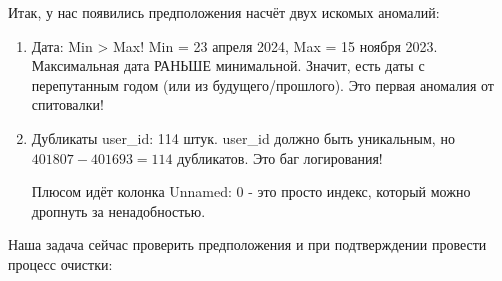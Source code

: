 \documentclass[pract]{SCWorks}
\begin{document}
Итак, у нас появились предположения насчёт двух искомых аномалий:

\begin{enumerate}
    \item Дата: Min > Max! Min = 23 апреля 2024, Max = 15 ноября 2023. Максимальная дата РАНЬШЕ минимальной. 
    Значит, есть даты с перепутанным годом (или из будущего/прошлого). Это первая аномалия от спитовалки!
    \item Дубликаты user\_id: 114 штук. user\_id должно быть уникальным, но $401807 - 401693 = 114$ дубликатов. 
    Это баг логирования!

    Плюсом идёт колонка Unnamed: 0 - это просто индекс, который можно дропнуть за ненадобностью.
\end{enumerate}

Наша задача сейчас проверить предположения и при подтверждении провести процесс очистки:
\end{document}

